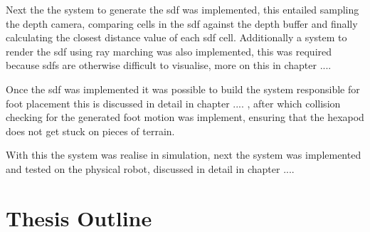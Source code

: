 Next the the system to generate the \ac{sdf} was implemented, this entailed sampling the depth camera, comparing cells in the \ac{sdf} against the depth buffer and finally calculating
the closest distance value of each \ac{sdf} cell. Additionally a system to render the \ac{sdf} using ray marching was also implemented, this was required because \ac{sdf}s are otherwise 
difficult to visualise, more on this in chapter ....

Once the \ac{sdf} was implemented it was possible to build the system responsible for foot placement this is discussed in detail in chapter .... , after which collision checking for the generated
foot motion was implement, ensuring that the hexapod does not get stuck on pieces of terrain.

With this the system was realise in simulation, next the system was implemented and tested on the physical robot, discussed in detail in chapter ....

\section{Thesis Outline}